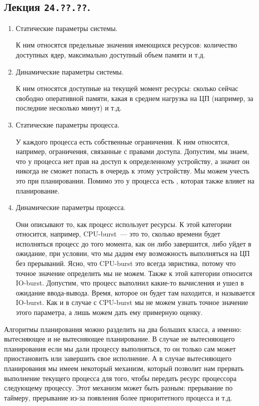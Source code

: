 \subsection{%
  Лекция \texttt{24.??.??}.%
}


\begin{enumerate}
\item
  Статические параметры системы.

  К ним относятся предельные значения имеющихся ресурсов: количество доступных
  ядер, максимально доступный объем памяти и т.д.

\item
  Динамические параметры системы.

  К ним относятся доступные на текущей момент ресурсы: сколько сейчас свободно
  оперативной памяти, какая в среднем нагрузка на ЦП (например, за последние
  несколько минут) и т.д.

\item
  Статические параметры процесса.

  У каждого процесса есть собственные ограничения. К ним относятся, например,
  ограничения, связанные с правами доступа. Допустим, мы знаем, что у процесса
  нет прав на доступ к определенному устройству, а значит он никогда не сможет
  попасть в очередь к этому устройству. Мы можем учесть это при планировании.
  Помимо это у процесса есть , которая также влияет на
  планирование.

\item
  Динамические параметры процесса.

  Они описывают то, как процесс использует ресурсы. К этой категории относится,
  например, CPU-burst~--- это то, сколько времени будет исполняться процесс до
  того момента, как он либо завершится, либо уйдет в ожидание, при условии, что
  мы дадим ему возможность выполняться на ЦП без прерываний. Ясно, что CPU-burst
  это всегда эвристика, потому что точное значение определить мы не можем. Также
  к этой категории относится IO-burst. Допустим, что процесс выполнил какие-то
  вычисления и ушел в ожидание ввода-вывода. Время, которое он будет там
  находится, и называется IO-burst. Как и в случае с CPU-burst мы не можем
  узнать точное значение этого параметра, а лишь можем дать ему примерную
  оценку.
\end{enumerate}


Алгоритмы планирования можно разделить на два больших класса, а именно:
вытесняющее и не вытесняющее планирование. В случае не вытесняющего планирования
если мы дали процессу выполняться, то он только сам может приостановить или
завершить свое исполнение. А в случае вытесняющего планирования мы имеем
некоторый механизм, который позволит нам прервать выполнение текущего процесса
для того, чтобы передать ресурс процессора следующему процессу. Этот механизм
может быть разным: прерывание по таймеру, прерывание из-за появления более
приоритетного процесса и т.д.


